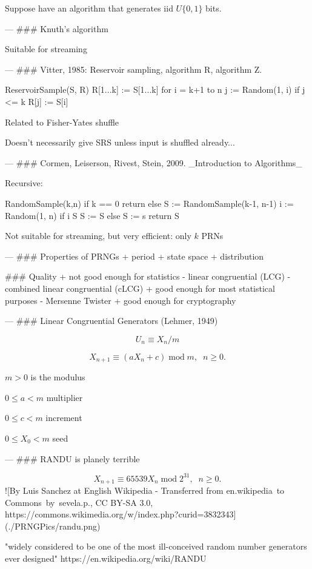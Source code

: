 \documentclass[fleqn]{beamer}
\theoremstyle{plain}
\begin{document}
\begin{frame}
Suppose have an algorithm that generates iid $U\{0, 1\}$ bits.



---
### Knuth's algorithm

Suitable for streaming

---
### Vitter, 1985: Reservoir sampling, algorithm R, algorithm Z. 

    ReservoirSample(S, R)
    R[1...k] :=  S[1...k]
    for i = k+1 to n
        j := Random(1, i)   
        if j <= k
            R[j] := S[i]

Related to Fisher-Yates shuffle

Doesn't necessarily give SRS unless input is shuffled already...

---
### Cormen, Leiserson, Rivest, Stein, 2009. _Introduction to Algorithms_

Recursive:

    RandomSample(k,n)
    if k == 0
        return {}
    else S := RandomSample(k-1, n-1)
        i := Random(1, n)
        if i \in S
            S := S 
        else S := s 
        return S
    
Not suitable for streaming, but very efficient: only $k$ PRNs

---
### Properties of PRNGs
+ period
+ state space
+ distribution

### Quality
+ not good enough for statistics
    - linear congruential (LCG)
    - combined linear congruential (cLCG)
+ good enough for most statistical purposes
    - Mersenne Twister
+ good enough for cryptography

---
### Linear Congruential Generators (Lehmer, 1949)

$$U_n \equiv X_n/m$$

$$ X_{n+1} \equiv (a X_n + c)\; \mathrm{mod} \; m, \;\; n \ge 0.$$

$ m > 0$ is the modulus

$ 0 \le a < m$ multiplier

$0 \le c < m$ increment

$0 \le X_0 < m$ seed

---
### RANDU is planely terrible

$$ X_{n+1} \equiv 65539 X_n\; \mathrm{mod} \; 2^{31}, \;\; n \ge 0.$$
![By Luis Sanchez at English Wikipedia - Transferred from en.wikipedia to Commons by sevela.p., CC BY-SA 3.0, https://commons.wikimedia.org/w/index.php?curid=3832343](./PRNGPics/randu.png)

"widely considered to be one of the most ill-conceived random number generators ever designed" https://en.wikipedia.org/wiki/RANDU


\end{frame}
\end{document}

